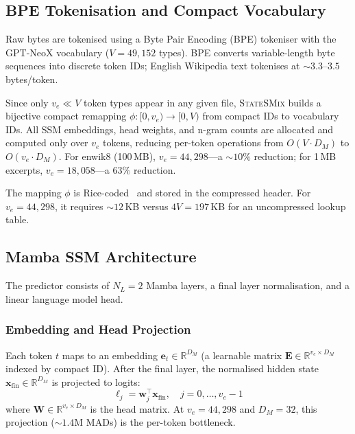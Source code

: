 \documentclass[10pt,twocolumn]{article}
\newcommand{\ssmcomp}{\textsc{StateSMix}}
\newcommand{\RR}{\mathbb{R}}
\begin{document}
\subsection{BPE Tokenisation and Compact Vocabulary}
\label{sec:vocab}

Raw bytes are tokenised using a Byte Pair Encoding (BPE) tokeniser
with the GPT-NeoX vocabulary ($V=49{,}152$ types).  BPE converts
variable-length byte sequences into discrete token IDs; English
Wikipedia text tokenises at ${\sim}3.3$--$3.5$ bytes/token.

Since only $v_e \ll V$ token types appear in any given file, \ssmcomp{}
builds a bijective compact remapping $\phi: [0,v_e)\to[0,V)$ from
compact IDs to vocabulary IDs.  All SSM embeddings, head weights, and
n-gram counts are allocated and computed only over $v_e$ tokens,
reducing per-token operations from $O(V\cdot D_M)$ to
$O(v_e\cdot D_M)$.  For enwik8 (100\,MB), $v_e=44{,}298$---a
${\sim}10\%$ reduction; for 1\,MB excerpts, $v_e=18{,}058$---a $63\%$
reduction.

The mapping $\phi$ is Rice-coded~\citep{rice1979} and stored in the
compressed header.  For $v_e=44{,}298$, it requires ${\sim}12$\,KB
versus $4V=197$\,KB for an uncompressed lookup table.

\subsection{Mamba SSM Architecture}
\label{sec:ssm}

The predictor consists of $N_L=2$ Mamba layers, a final layer
normalisation, and a linear language model head.

\subsubsection{Embedding and Head Projection}

Each token $t$ maps to an embedding $\mathbf{e}_t\in\RR^{D_M}$
(a learnable matrix $\mathbf{E}\in\RR^{v_e\times D_M}$ indexed by
compact ID).  After the final layer, the normalised hidden state
$\mathbf{x}_\text{fin}\in\RR^{D_M}$ is projected to logits:
\begin{equation}
  \ell_j = \mathbf{w}_j^\top\!\mathbf{x}_\text{fin},
  \quad j=0,\ldots,v_e-1
\end{equation}
where $\mathbf{W}\in\RR^{v_e\times D_M}$ is the head matrix.  At
$v_e=44{,}298$ and $D_M=32$, this projection (${\sim}1.4$M MADs) is
the per-token bottleneck.
\end{document}
